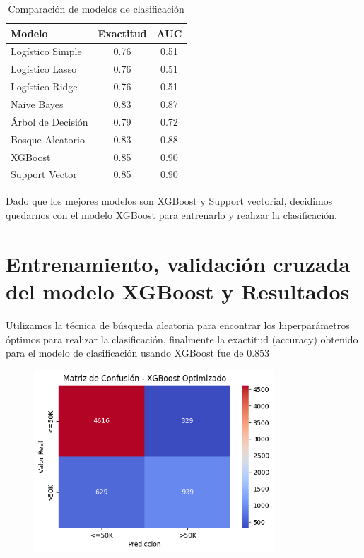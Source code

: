 \documentclass{article}
\begin{document}
	\begin{table}[ht]
		\centering
		\begin{tabular}{|l|c|c|}
			\hline
			\textbf{Modelo} & \textbf{Exactitud} & \textbf{AUC} \\
			\hline
			Logístico Simple  & 0.76 & 0.51 \\
			Logístico Lasso   & 0.76 & 0.51 \\
			Logístico Ridge   & 0.76 & 0.51 \\
			Naive Bayes       & 0.83 & 0.87 \\
			Árbol de Decisión & 0.79 & 0.72 \\
			Bosque Aleatorio  & 0.83 & 0.88 \\
			XGBoost           & 0.85 & 0.90 \\
			Support Vector    & 0.85 & 0.90 \\
			\hline
		\end{tabular}
		\caption{Comparación de modelos de clasificación}
		\label{tab:modelos}
	\end{table}
	
	Dado que los mejores modelos son XGBoost y Support vectorial, decidimos quedarnos con el modelo XGBoost para entrenarlo y realizar la clasificación.
	
	\section{Entrenamiento, validación cruzada del modelo XGBoost y Resultados}
	
	Utilizamos la técnica de búsqueda aleatoria para encontrar los hiperparámetros óptimos para realizar la clasificación, finalmente la exactitud (accuracy) obtenido para el modelo de clasificación usando XGBoost fue de $0.853$
	
	\begin{figure}[H]
		\centering
		\includegraphics[width=0.8\textwidth]{matriz_XGBoost.png}
	\end{figure}
	
\end{document}
